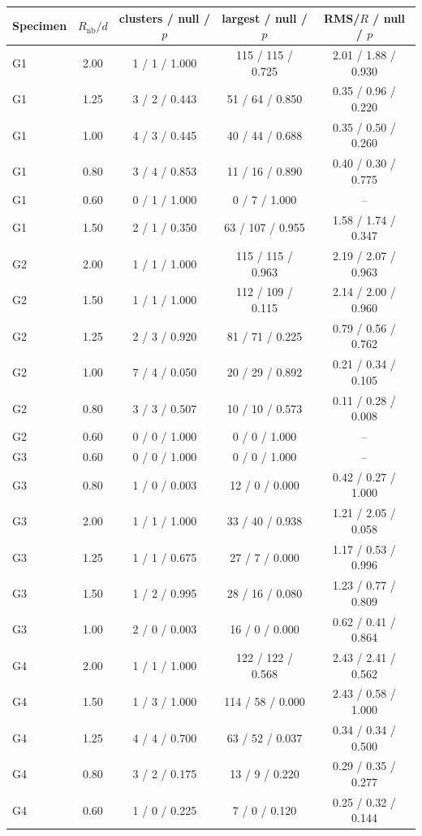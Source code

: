 \begin{tabular}{lcccc}
\toprule
Specimen & $R_\mathrm{nb}/d$ & clusters / null / $p$ & largest / null / $p$ & RMS/$R$ / null / $p$ \\
\midrule
G1 & 2.00 & 1 / 1 / 1.000 & 115 / 115 / 0.725 & 2.01 / 1.88 / 0.930 \\
G1 & 1.25 & 3 / 2 / 0.443 & 51 / 64 / 0.850 & 0.35 / 0.96 / 0.220 \\
G1 & 1.00 & 4 / 3 / 0.445 & 40 / 44 / 0.688 & 0.35 / 0.50 / 0.260 \\
G1 & 0.80 & 3 / 4 / 0.853 & 11 / 16 / 0.890 & 0.40 / 0.30 / 0.775 \\
G1 & 0.60 & 0 / 1 / 1.000 & 0 / 7 / 1.000 & -- \\
G1 & 1.50 & 2 / 1 / 0.350 & 63 / 107 / 0.955 & 1.58 / 1.74 / 0.347 \\
G2 & 2.00 & 1 / 1 / 1.000 & 115 / 115 / 0.963 & 2.19 / 2.07 / 0.963 \\
G2 & 1.50 & 1 / 1 / 1.000 & 112 / 109 / 0.115 & 2.14 / 2.00 / 0.960 \\
G2 & 1.25 & 2 / 3 / 0.920 & 81 / 71 / 0.225 & 0.79 / 0.56 / 0.762 \\
G2 & 1.00 & 7 / 4 / 0.050 & 20 / 29 / 0.892 & 0.21 / 0.34 / 0.105 \\
G2 & 0.80 & 3 / 3 / 0.507 & 10 / 10 / 0.573 & 0.11 / 0.28 / 0.008 \\
G2 & 0.60 & 0 / 0 / 1.000 & 0 / 0 / 1.000 & -- \\
G3 & 0.60 & 0 / 0 / 1.000 & 0 / 0 / 1.000 & -- \\
G3 & 0.80 & 1 / 0 / 0.003 & 12 / 0 / 0.000 & 0.42 / 0.27 / 1.000 \\
G3 & 2.00 & 1 / 1 / 1.000 & 33 / 40 / 0.938 & 1.21 / 2.05 / 0.058 \\
G3 & 1.25 & 1 / 1 / 0.675 & 27 / 7 / 0.000 & 1.17 / 0.53 / 0.996 \\
G3 & 1.50 & 1 / 2 / 0.995 & 28 / 16 / 0.080 & 1.23 / 0.77 / 0.809 \\
G3 & 1.00 & 2 / 0 / 0.003 & 16 / 0 / 0.000 & 0.62 / 0.41 / 0.864 \\
G4 & 2.00 & 1 / 1 / 1.000 & 122 / 122 / 0.568 & 2.43 / 2.41 / 0.562 \\
G4 & 1.50 & 1 / 3 / 1.000 & 114 / 58 / 0.000 & 2.43 / 0.58 / 1.000 \\
G4 & 1.25 & 4 / 4 / 0.700 & 63 / 52 / 0.037 & 0.34 / 0.34 / 0.500 \\
G4 & 0.80 & 3 / 2 / 0.175 & 13 / 9 / 0.220 & 0.29 / 0.35 / 0.277 \\
G4 & 0.60 & 1 / 0 / 0.225 & 7 / 0 / 0.120 & 0.25 / 0.32 / 0.144 \\

\end{tabular}
